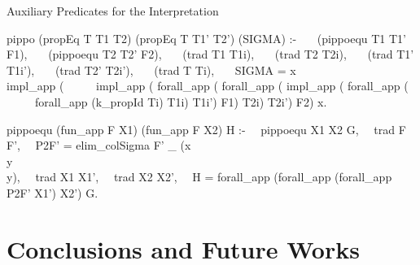 \documentclass{beamer}
\begin{document}
\begin{frame}[fragile]{Auxiliary Predicates for the Interpretation}
\small\vspace{-0.2cm}
\begin{semiverbatim}
pippo (propEq T T1 T2) (propEq T T1' T2') (SIGMA) :- 
\ \ \ (pippoequ T1 T1' F1),
\ \ \ (pippoequ T2 T2' F2),
\ \ \ (trad T1 T1i),
\ \ \ (trad T2 T2i),
\ \ \ (trad T1' T1i'),
\ \ \ (trad T2' T2i'),
\ \ \ (trad T Ti),
\ \ \ SIGMA = x\\ impl_app ( 
\ \ \ \ \ impl_app ( forall_app ( forall_app ( impl_app ( forall_app ( 
\ \ \ \ \ forall_app (k_propId Ti) T1i) T1i') F1) T2i) T2i') F2)  x.
\end{semiverbatim}
\begin{semiverbatim}
	pippoequ (fun_app F X1) (fun_app F X2) H :-
	\ \ pippoequ X1 X2 G,
	\ \ trad F F',
	\ \ P2F' = elim_colSigma F' _ (x\\ y\\ y),
	\ \ trad X1 X1',
	\ \ trad X2 X2',
	\ \ H = forall_app (forall_app (forall_app P2F' X1') X2') G. 
\end{semiverbatim}
\end{frame}

\section{Conclusions and Future Works}
\end{document}
